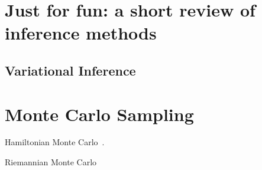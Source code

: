 \documentclass{tufte-book}
\begin{document}
\section{Just for fun: a short review of inference methods}

\subsection{Variational Inference}

\section{Monte Carlo Sampling}


Hamiltonian Monte Carlo~\cite{Betancourt2017}.

Riemannian Monte Carlo~\cite{Betancourt2013}


\mainmatter








\backmatter




\printindex
\end{document}
